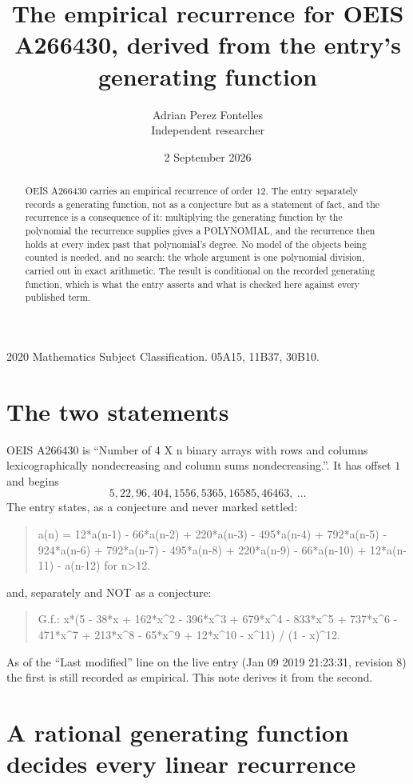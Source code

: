 \documentclass[11pt,a4paper]{article}
\title{The empirical recurrence for OEIS A266430, derived from the entry's generating function}
\author{Adrian Perez Fontelles\\ \small Independent researcher}
\date{2 September 2026}
\theoremstyle{plain}
\theoremstyle{definition}
\begin{document}
\maketitle

\begin{abstract}
OEIS A266430 carries an empirical recurrence of order $12$. The entry separately records a
generating function, not as a conjecture but as a statement of fact, and the recurrence is a
consequence of it: multiplying the generating function by the polynomial the recurrence
supplies gives a POLYNOMIAL, and the recurrence then holds at every index past that
polynomial's degree. No model of the objects being counted is needed, and no search: the
whole argument is one polynomial division, carried out in exact arithmetic. The result is
conditional on the recorded generating function, which is what the entry asserts and what is
checked here against every published term.
\end{abstract}

\noindent\small 2020 Mathematics Subject Classification. 05A15, 11B37, 30B10.\normalsize

\section{The two statements}

OEIS A266430 is ``Number of 4 X n binary arrays with rows and columns lexicographically nondecreasing and column sums nondecreasing.''. It has offset $1$ and begins
\[
5, 22, 96, 404, 1556, 5365, 16585, 46463,\ \dots
\]
The entry states, as a conjecture and never marked settled:
\begin{quote}
a(n) = 12*a(n-1) - 66*a(n-2) + 220*a(n-3) - 495*a(n-4) + 792*a(n-5) - 924*a(n-6) + 792*a(n-7) - 495*a(n-8) + 220*a(n-9) - 66*a(n-10) + 12*a(n-11) - a(n-12) for n>12.
\end{quote}
and, separately and NOT as a conjecture:
\begin{quote}
G.f.: x*(5 - 38*x + 162*x\^{}2 - 396*x\^{}3 + 679*x\^{}4 - 833*x\^{}5 + 737*x\^{}6 - 471*x\^{}7 + 213*x\^{}8 - 65*x\^{}9 + 12*x\^{}10 - x\^{}11) / (1 - x)\^{}12.
\end{quote}
As of the ``Last modified'' line on the live entry (Jan 09 2019 21:23:31, revision 8) the first is still
recorded as empirical. This note derives it from the second.

\section{A rational generating function decides every linear recurrence}
\end{document}
